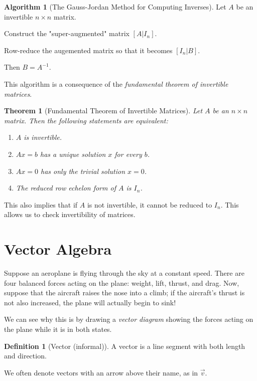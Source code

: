 \documentclass[10pt, a4paper]{amsart}
\newtheorem{thm}{Theorem}
\theoremstyle{definition}
\newtheorem{defn}{Definition}
\newtheorem{alg}{Algorithm}
\theoremstyle{remark}
\begin{document}
\begin{alg}[The Gauss-Jordan Method for Computing Inverses]
  Let $ A $ be an invertible $ n \times n $ matrix.
  \item Construct the "super-augmented" matrix $ [ A | I_n ] $.
  \item Row-reduce the augemented matrix so that it becomes $ [ I_n | B ] $.
  \item Then $ B = A^{-1} $.
\end{alg}

This algorithm is a consequence of the \emph{fundamental theorem of invertible
matrices}.
\begin{thm}[Fundamental Theorem of Invertible Matrices]
  Let $ A $ be an $ n \times n $ matrix. Then the following statements are equivalent:
  \begin{enumerate}
    \item $ A $ is invertible.
    \item $ Ax = b $ has a unique solution $ x $ for every $ b $.
    \item $ Ax = 0 $ has only the trivial solution $ x = 0 $.
    \item The reduced row echelon form of $ A $ is $ I_n $.
  \end{enumerate}
\end{thm}

This also implies that if $ A $ is not invertible, it cannot be reduced to $ I_n $. This
allows us to check invertibility of matrices.

\section{Vector Algebra}
Suppose an aeroplane is flying through the sky at a constant speed. There are four balanced
forces acting on the plane: weight, lift, thrust, and drag. Now, suppose that the aircraft
raises the nose into a climb; if the aircraft's thrust is not also increased, the plane will
actually begin to sink!

We can see why this is by drawing a \emph{vector diagram} showing the forces acting on the
plane while it is in both states.

\begin{defn}[Vector (informal)]
  A vector is a line segment with both length and direction.
\end{defn}

We often denote vectors with an arrow above their name, as in $ \overrightarrow{v} $.
\end{document}
